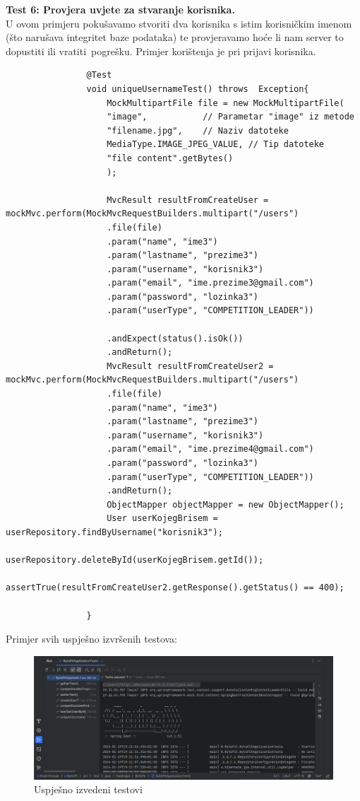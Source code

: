 			\textbf{Test 6: Provjera uvjete za stvaranje korisnika.}\\
			U ovom primjeru pokušavamo stvoriti dva korisnika s istim korisničkim imenom (što narušava integritet baze podataka) te provjeravamo hoće li nam server to dopustiti ili vratiti pogrešku. Primjer korištenja je pri prijavi korisnika.
			\begin{lstlisting}
				@Test
				void uniqueUsernameTest() throws  Exception{
					MockMultipartFile file = new MockMultipartFile(
					"image",           // Parametar "image" iz metode
					"filename.jpg",    // Naziv datoteke
					MediaType.IMAGE_JPEG_VALUE, // Tip datoteke
					"file content".getBytes()   
					);
					
					MvcResult resultFromCreateUser = mockMvc.perform(MockMvcRequestBuilders.multipart("/users")
					.file(file)
					.param("name", "ime3")
					.param("lastname", "prezime3")
					.param("username", "korisnik3")
					.param("email", "ime.prezime3@gmail.com")
					.param("password", "lozinka3")
					.param("userType", "COMPETITION_LEADER"))
					
					.andExpect(status().isOk())
					.andReturn();
					MvcResult resultFromCreateUser2 = mockMvc.perform(MockMvcRequestBuilders.multipart("/users")
					.file(file)
					.param("name", "ime3")
					.param("lastname", "prezime3")
					.param("username", "korisnik3")
					.param("email", "ime.prezime4@gmail.com")
					.param("password", "lozinka3")
					.param("userType", "COMPETITION_LEADER"))
					.andReturn();
					ObjectMapper objectMapper = new ObjectMapper();
					User userKojegBrisem = userRepository.findByUsername("korisnik3");
					userRepository.deleteById(userKojegBrisem.getId());
					assertTrue(resultFromCreateUser2.getResponse().getStatus() == 400);
					
				}	
			\end{lstlisting}
			
			Primjer svih uspješno izvršenih testova:
			\begin{figure}[H]
				\includegraphics[scale=0.6]{slike/test1}
				\centering
				\caption{Uspješno izvedeni testovi}
				\label{fig:uspjeh}
			\end{figure}
			
